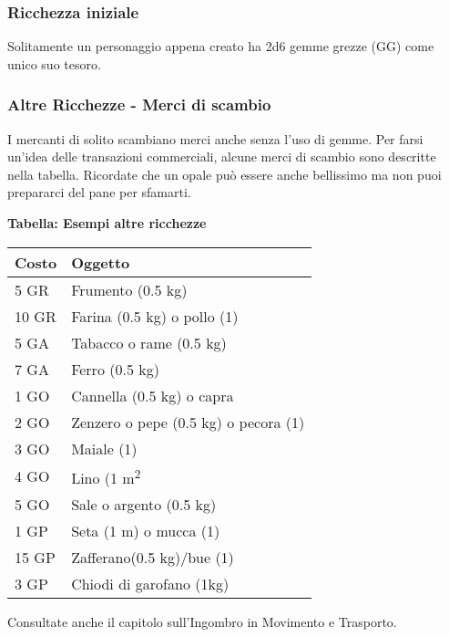 \documentclass[12pt,a4paper,twoside,openany]{book}
\begin{document}
\bigskip

\begin{multicols}{2}

\subsubsection{Ricchezza iniziale}

Solitamente un personaggio appena creato ha 2d6 gemme grezze (GG) come unico suo tesoro.

\subsubsection{Altre Ricchezze - Merci di scambio}

I mercanti di solito scambiano merci anche senza l'uso di gemme.
Per farsi un'idea delle transazioni commerciali, alcune merci di scambio sono descritte nella tabella. Ricordate che un opale può essere anche bellissimo ma non puoi prepararci del pane per sfamarti.

\medskip

\textbf{Tabella: Esempi altre ricchezze}

\medskip


\begin{tabular}{ll}
\textbf{Costo} & \textbf{Oggetto}\\
\toprule
5 GR & Frumento (0.5 kg)\\
10 GR & Farina (0.5 kg) o pollo (1)\\
5 GA & Tabacco o rame (0.5 kg)\\
7 GA & Ferro (0.5 kg)\\
1 GO & Cannella (0.5 kg) o capra \\
2 GO & Zenzero o pepe (0.5 kg) o pecora (1)\\
3 GO & Maiale (1) \\
4 GO & Lino (1 m\textsuperscript{2}\\
5 GO & Sale o argento (0.5 kg) \\
1 GP& Seta (1 m) o mucca (1)\\
15 GP& Zafferano(0.5 kg)/bue (1)\\
3 GP&Chiodi di garofano (1kg)\\
\end{tabular}

\medskip

Consultate anche il capitolo sull'Ingombro in Movimento e Trasporto.

\end{multicols}
\end{document}
